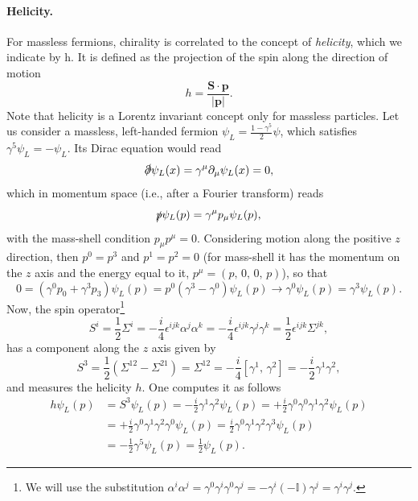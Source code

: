 \paragraph{Helicity.}
For massless fermions, chirality is correlated to the concept of \textit{helicity}, which we indicate by h. It is defined as the projection of the spin along the direction of motion
\begin{equation}
    h = \frac{\mathbf{S} \cdot \mathbf{p}}{\vert \mathbf{p} \vert}.
    \label{eq:helicity}
\end{equation}
Note that helicity is a Lorentz invariant concept only for massless particles. Let us consider a massless, left-handed fermion \(\psi_L = \frac{1-\gamma^5}{2}\psi\), which satisfies \(\gamma^5 \psi_L = -\psi_L\). Its Dirac equation would read
\[
    \slashed{\partial} \psi_L(x) = \gamma^{\mu} \partial_\mu \psi_L(x) = 0,
\]
which in momentum space (i.e., after a Fourier transform) reads
\[
    \slashed{p} \psi_L(p) = \gamma^{\mu}p_\mu \psi_L(p),
\]
with the mass-shell condition \(p_\mu p^{\mu} = 0\). Considering motion along the positive \(z\) direction, then \(p^0 = p^3\) and \(p^1 = p^2 = 0\) (for mass-shell it has the momentum on the \(z\) axis and the energy equal to it, \(p^{\mu} = (p,\, 0,\, 0,\, p)\)), so that
\[
    0 = (\gamma^0 p_0 + \gamma^3 p_3) \psi_L(p) = p^0(\gamma^3 - \gamma^0) \psi_L(p) \longrightarrow \gamma^0 \psi_L(p) = \gamma^3 \psi_L (p).
\]
Now, the spin operator\footnote{We will use the substitution \(\alpha^i \alpha^j = \gamma^0 \gamma^i \gamma^0 \gamma^j = - \gamma^i (-\mathbb{I}) \gamma^j = \gamma^i \gamma^j\).}
\[
    S^i = \frac{1}{2} \Sigma^i = -\frac{i}{4} \epsilon^{ijk} \alpha^j \alpha^k = -\frac{i}{4} \epsilon^{ijk} \gamma^j \gamma^k = \frac{1}{2} \epsilon^{ijk} \Sigma^{jk},
\]
has a component along the \(z\) axis given by
\[
    S^3 = \frac{1}{2} (\Sigma^{12} - \Sigma^{21}) = \Sigma^{12} = -\frac{i}{4} [\gamma^1,\,\gamma^2] = -\frac{i}{2} \gamma^1 \gamma^2,
\]
and measures the helicity \(h\). One computes it as follows
\[
    \begin{aligned}
        h \psi_L (p) & = S^3 \psi_L (p) = -\frac{i}{2}\gamma^1 \gamma^2 \psi_L (p) = + \frac{i}{2}\gamma^0 \gamma^0 \gamma^1 \gamma^2 \psi_L (p) \\
                     & = + \frac{i}{2}\gamma^0 \gamma^1 \gamma^2 \gamma^0 \psi_L (p) = \frac{i}{2}\gamma^0 \gamma^1 \gamma^2 \gamma^3 \psi_L (p) \\
                     & = -\frac{1}{2} \gamma^5 \psi_L(p) = \frac{1}{2} \psi_L(p).
    \end{aligned}
\]
